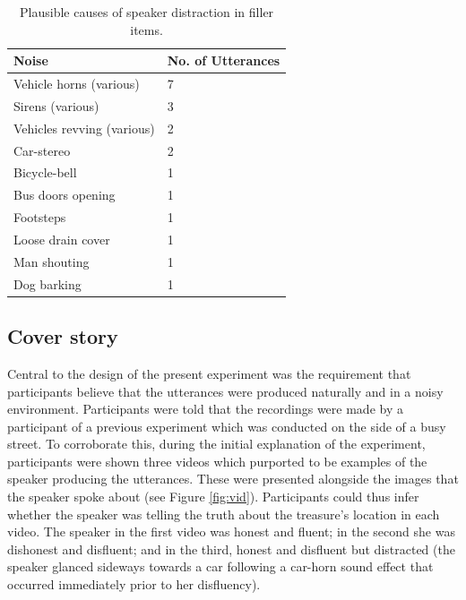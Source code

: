 \documentclass[a4paper,man,natbib]{apa6}
\begin{document}
\begin{table}
\caption{Plausible causes of speaker distraction in filler items.}
\label{table:fillernoise}
\begin{tabularx}{\linewidth}{YY}
\hline
Noise & No. of Utterances\\
\hline
Vehicle horns (various) & 7 \\
Sirens (various) & 3 \\
Vehicles revving (various) & 2 \\
Car-stereo & 2 \\
Bicycle-bell & 1 \\
Bus doors opening & 1 \\
Footsteps & 1 \\
Loose drain cover & 1 \\
Man shouting & 1 \\
Dog barking & 1 \\
\hline
\end{tabularx}
\end{table}

\subsection{Cover story}
Central to the design of the present experiment was the requirement that participants believe that the utterances were produced naturally and in a noisy environment. 
Participants were told that the recordings were made by a participant of a previous experiment which was conducted on the side of a busy street. 
To corroborate this, during the initial explanation of the experiment, participants were shown three videos which purported to be examples of the speaker producing the utterances. 
These were presented alongside the images that the speaker spoke about (see Figure \ref{fig:vid}). 
Participants could thus infer whether the speaker was telling the truth about the treasure's location in each video.
The speaker in the first video was honest and fluent; in the second she was dishonest and disfluent; and in the third, honest and disfluent but distracted (the speaker glanced sideways towards a car following a car-horn sound effect that occurred immediately prior to her disfluency).
\end{document}
